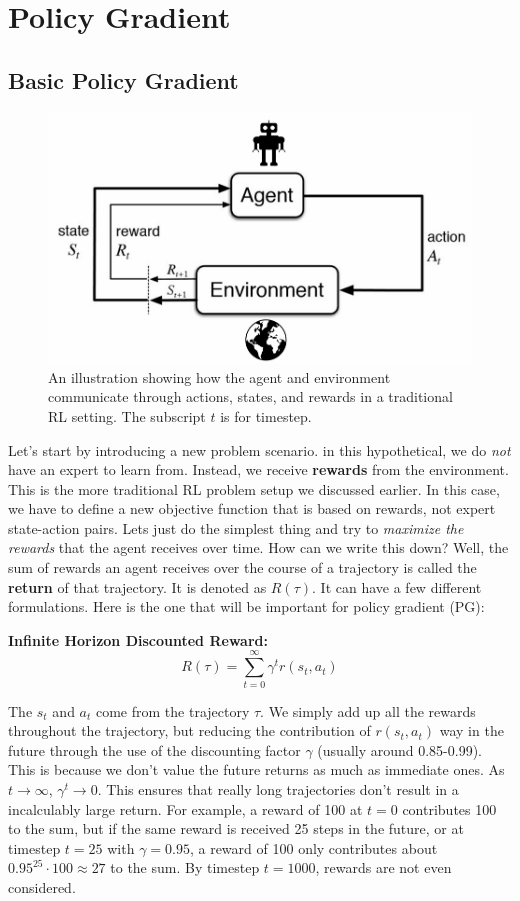 \section{Policy Gradient}
\subsection{Basic Policy Gradient}
\begin{flushleft}

    \begin{figure}[H]
            \centering
            \includegraphics[width=0.7\linewidth]{rl/rlsystem.png}
            \caption{An illustration showing how the agent and environment communicate through actions, states, and rewards in a traditional RL setting. The subscript $t$ is for timestep.}
            \label{fig:rlsystem}
    \end{figure}
    
    \large Let's start by introducing a new problem scenario. in this hypothetical, we do \textit{not} have an expert to learn from. Instead, we receive \textbf{rewards} from the environment. This is the more traditional RL problem setup we discussed earlier. In this case, we have to define a new objective function that is based on rewards, not expert state-action pairs. Lets just do the simplest thing and try to \textit{maximize the rewards} that the agent receives over time. How can we write this down? Well, the sum of rewards an agent receives over the course of a trajectory is called the \textbf{return} of that trajectory. It is denoted as $R(\tau)$. It can have a few different formulations. Here is the one that will be important for policy gradient (PG): \break

    \textbf{Infinite Horizon Discounted Reward:}
    $$R(\tau) = \sum_{t=0}^\infty \gamma^t r(s_t, a_t)$$

    The $s_t$ and $a_t$ come from the trajectory $\tau$. We simply add up all the rewards throughout the trajectory, but reducing the contribution of $r(s_t,a_t)$ way in the future through the use of the discounting factor $\gamma$ (usually around 0.85-0.99). This is because we don't value the future returns as much as immediate ones. As $t \rightarrow \infty$, $\gamma^t \rightarrow 0$. This ensures that really long trajectories don't result in a incalculably large return. For example, a reward of 100 at $t = 0$ contributes 100 to the sum, but if the same reward is received 25 steps in the future, or at timestep $t = 25$ with $\gamma = 0.95$, a reward of 100 only contributes about $0.95^{25}\cdot100 \approx 27$ to the sum. By timestep $t = 1000$, rewards are not even considered. \break


\end{flushleft}

